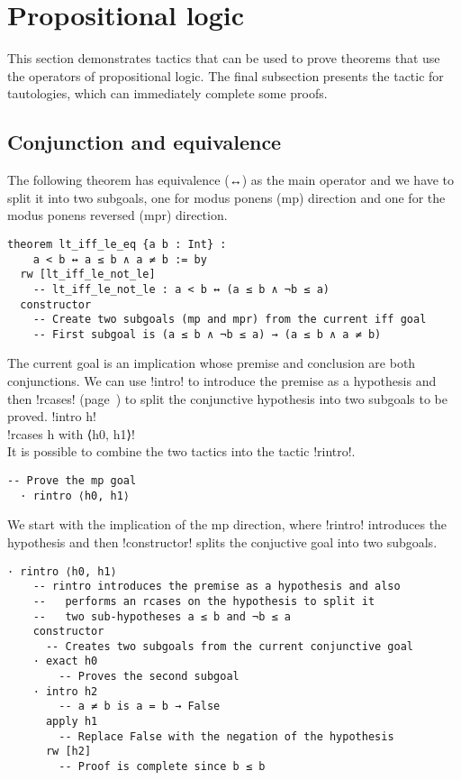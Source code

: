 
\section{Propositional logic}

This section demonstrates tactics that can be used to prove theorems that use the operators of propositional logic. The final subsection presents the tactic for tautologies, which can immediately complete some proofs.

\subsection{Conjunction and equivalence}

The following theorem has equivalence (↔) as the main operator and we have to split it into two subgoals, one for modus ponens (mp) direction and one for the modus ponens reversed (mpr) direction.

\begin{Verbatim}
theorem lt_iff_le_eq {a b : Int} : 
    a < b ↔ a ≤ b ∧ a ≠ b := by
  rw [lt_iff_le_not_le]
    -- lt_iff_le_not_le : a < b ↔ (a ≤ b ∧ ¬b ≤ a)
  constructor
    -- Create two subgoals (mp and mpr) from the current iff goal
    -- First subgoal is (a ≤ b ∧ ¬b ≤ a) → (a ≤ b ∧ a ≠ b)
 \end{Verbatim}


The current goal is an implication whose premise and conclusion are both conjunctions. We can use !intro! to introduce the premise as a hypothesis and then !rcases! (page~\pageref{p.rcases}) to split the conjunctive hypothesis into two subgoals to be proved.
\indnt{}!intro h!\\
\indnt{}!rcases h with ⟨h0, h1⟩!\\
It is possible to combine the two tactics into the tactic !rintro!.
\begin{Verbatim}[firstnumber=last]
  -- Prove the mp goal
  · rintro ⟨h0, h1⟩
\end{Verbatim}

We start with the implication of the mp direction, where !rintro! introduces the hypothesis and then !constructor! splits the conjuctive goal into two subgoals.
\begin{Verbatim}[firstnumber=last]
  · rintro ⟨h0, h1⟩
    -- rintro introduces the premise as a hypothesis and also
    --   performs an rcases on the hypothesis to split it
    --   two sub-hypotheses a ≤ b and ¬b ≤ a
    constructor
      -- Creates two subgoals from the current conjunctive goal
    · exact h0
        -- Proves the second subgoal
    · intro h2
        -- a ≠ b is a = b → False
      apply h1
        -- Replace False with the negation of the hypothesis
      rw [h2]
        -- Proof is complete since b ≤ b
\end{Verbatim}

